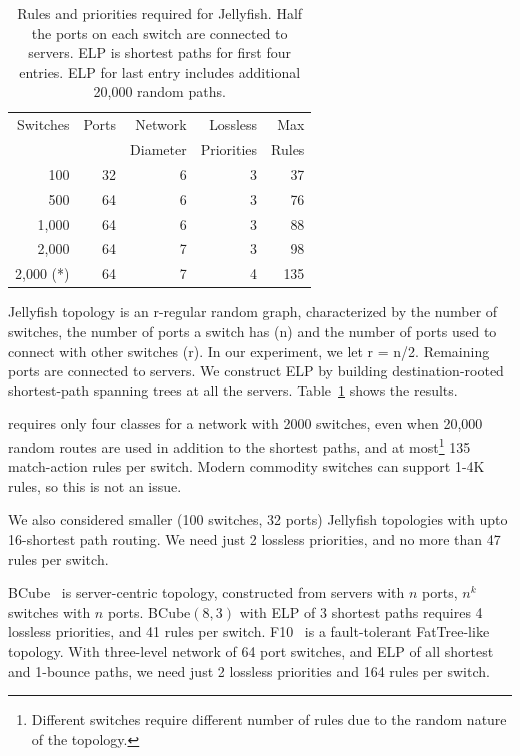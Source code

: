\begin{table}[t]
		\footnotesize
	\centering
		\begin{tabular}{|r|r|r|r|r|}
			\hline
				Switches & Ports & Network & Lossless & Max \\
						 &		 & Diameter & Priorities & Rules \\
			\hline
			\hline
			100 & 32 & 6 & 3 &  37 \\
			\hline
			500 & 64 & 6 & 3 & 76 \\
			\hline
			1,000 & 64 & 6 & 3 & 88 \\
			\hline
			2,000 & 64 & 7 & 3 & 98 \\
			\hline
			2,000 (*)  & 64 & 7 & 4 &  135\\
			\hline
			
		\end{tabular} 
		\caption{Rules and priorities required for Jellyfish. Half the ports on
		each switch are connected to servers. ELP is shortest paths for first four entries. ELP for last entry includes additional 20,000 random paths.}
\label{table:jellyfish_shortestpath} \end{table}

Jellyfish topology is an r-regular random graph, characterized by the number of
switches, the number of ports a switch has (n) and the number of ports used to
connect with other switches (r).  In our experiment, we let r = n/2. Remaining
ports are connected to servers. We construct ELP by building destination-rooted
shortest-path spanning trees at all the servers.
Table~\ref{table:jellyfish_shortestpath} shows the results.  

\sysname{} requires only four classes for a network with 2000 switches, even
when 20,000 random routes are used in addition to the shortest paths, and at
most\footnote{Different switches require different number of rules due to the
random nature of the topology.} 135 match-action rules per switch.  Modern
commodity switches can support 1-4K rules, so this is not an issue. 

We also considered smaller (100 switches, 32 ports) Jellyfish topologies with
upto 16-shortest path routing. We need just 2 lossless priorities, and no more
than 47 rules per switch.

BCube~\cite{bcube} is server-centric topology, constructed from servers with $n$
ports, $n^k$ switches with $n$ ports. BCube$(8,3)$ with ELP of $3$ shortest
paths requires 4 lossless priorities, and 41 rules per switch.
F10~\cite{f10} is a fault-tolerant FatTree-like topology.  With three-level
network of 64 port switches, and ELP of all shortest and 1-bounce paths, we need
just 2 lossless priorities and 164 rules per switch.

